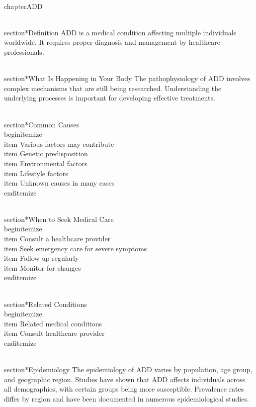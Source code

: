 
\\chapter{ADD}

\\section*{Definition}
ADD is a medical condition affecting multiple individuals worldwide. It requires proper diagnosis and management by healthcare professionals.

\\section*{What Is Happening in Your Body}
The pathophysiology of ADD involves complex mechanisms that are still being researched. Understanding the underlying processes is important for developing effective treatments.

\\section*{Common Causes}
\\begin{itemize}
\\item Various factors may contribute\n  \\item Genetic predisposition\n  \\item Environmental factors\n  \\item Lifestyle factors\n  \\item Unknown causes in many cases
\\end{itemize}

\\section*{When to Seek Medical Care}
\\begin{itemize}
\\item Consult a healthcare provider\n  \\item Seek emergency care for severe symptoms\n  \\item Follow up regularly\n  \\item Monitor for changes
\\end{itemize}

\\section*{Related Conditions}
\\begin{itemize}
\\item Related medical conditions\n  \\item Consult healthcare provider
\\end{itemize}

\\section*{Epidemiology}
The epidemiology of ADD varies by population, age group, and geographic region. Studies have shown that ADD affects individuals across all demographics, with certain groups being more susceptible. Prevalence rates differ by region and have been documented in numerous epidemiological studies.


